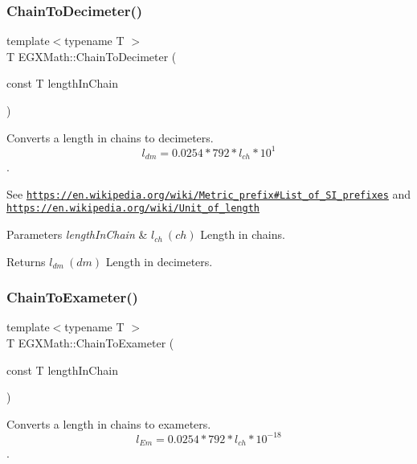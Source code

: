 \subsubsection{\texorpdfstring{Chain\+To\+Decimeter()}{ChainToDecimeter()}}
{\footnotesize\ttfamily template$<$typename T $>$ \\
T E\+G\+X\+Math\+::\+Chain\+To\+Decimeter (\begin{DoxyParamCaption}\item[{const T}]{length\+In\+Chain }\end{DoxyParamCaption})}



Converts a length in chains to decimeters. \[ l_{dm}=0.0254 * 792 * l_{ch} * 10^{1} \]. 

See \href{https://en.wikipedia.org/wiki/Metric_prefix#List_of_SI_prefixes}{\tt https\+://en.\+wikipedia.\+org/wiki/\+Metric\+\_\+prefix\#\+List\+\_\+of\+\_\+\+S\+I\+\_\+prefixes} and \href{https://en.wikipedia.org/wiki/Unit_of_length}{\tt https\+://en.\+wikipedia.\+org/wiki/\+Unit\+\_\+of\+\_\+length} 
\begin{DoxyParams}{Parameters}
{\em length\+In\+Chain} & $ l_{ch}\ (ch)$ Length in chains. \\
\hline
\end{DoxyParams}
\begin{DoxyReturn}{Returns}
$ l_{dm}\ (dm)$ Length in decimeters. 
\end{DoxyReturn}
\mbox{\label{group___e_g_x_math-_conversions-_length_conversions-_surveyors-_chain-_s_i_ga82f07f687e804faabd25839c5066792a}} 
\subsubsection{\texorpdfstring{Chain\+To\+Exameter()}{ChainToExameter()}}
{\footnotesize\ttfamily template$<$typename T $>$ \\
T E\+G\+X\+Math\+::\+Chain\+To\+Exameter (\begin{DoxyParamCaption}\item[{const T}]{length\+In\+Chain }\end{DoxyParamCaption})}



Converts a length in chains to exameters. \[ l_{Em}=0.0254 * 792 * l_{ch} * 10^{-18} \]. 

